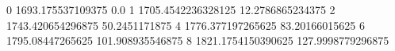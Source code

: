 0 1693.175537109375 0.0
1 1705.4542236328125 12.2786865234375
2 1743.420654296875 50.2451171875
4 1776.377197265625 83.20166015625
6 1795.08447265625 101.908935546875
8 1821.1754150390625 127.9998779296875
